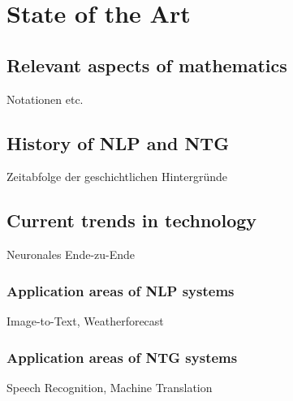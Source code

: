 \chapter{State of the Art}\label{ch:data}

\section{Relevant aspects of mathematics}

Notationen etc.

\section{History of NLP and NTG}

Zeitabfolge der geschichtlichen Hintergründe

\section{Current trends in technology}\label{ss:trends}

Neuronales Ende-zu-Ende

\subsection{Application areas of NLP systems}
Image-to-Text, Weatherforecast

\subsection{Application areas of NTG systems}
Speech Recognition, Machine Translation